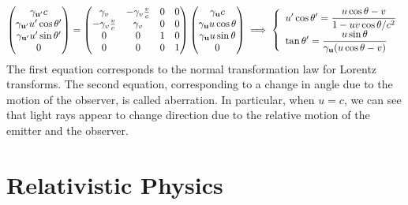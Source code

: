 \documentclass{article}
\begin{document}
\[ \begin{pmatrix}
		\gamma_{\vb u'}c             \\
		\gamma_{\vb u'}u'\cos\theta' \\
		\gamma_{\vb u'}u'\sin\theta' \\
		0
	\end{pmatrix} = \begin{pmatrix}
		\gamma_v              & -\gamma_v \frac{v}{c} & 0 & 0 \\
		-\gamma_v \frac{v}{c} & \gamma_v              & 0 & 0 \\
		0                     & 0                     & 1 & 0 \\
		0                     & 0                     & 0 & 1
	\end{pmatrix} \begin{pmatrix}
		\gamma_{\vb u}c           \\
		\gamma_{\vb u}u\cos\theta \\
		\gamma_{\vb u}u\sin\theta \\
		0
	\end{pmatrix} \implies \left\{ \begin{array}{l}
		\displaystyle
		u'\cos\theta' = \frac{u\cos\theta - v}{1 - uv\cos\theta/c^2}      \\
		\displaystyle
		\tan\theta' = \frac{u\sin\theta}{\gamma_{\vb u}(u\cos\theta - v)} \\
	\end{array} \right. \]
The first equation corresponds to the normal transformation law for Lorentz transforms. The second equation, corresponding to a change in angle due to the motion of the observer, is called aberration. In particular, when $u = c$, we can see that light rays appear to change direction due to the relative motion of the emitter and the observer.

\section{Relativistic Physics}
\end{document}
